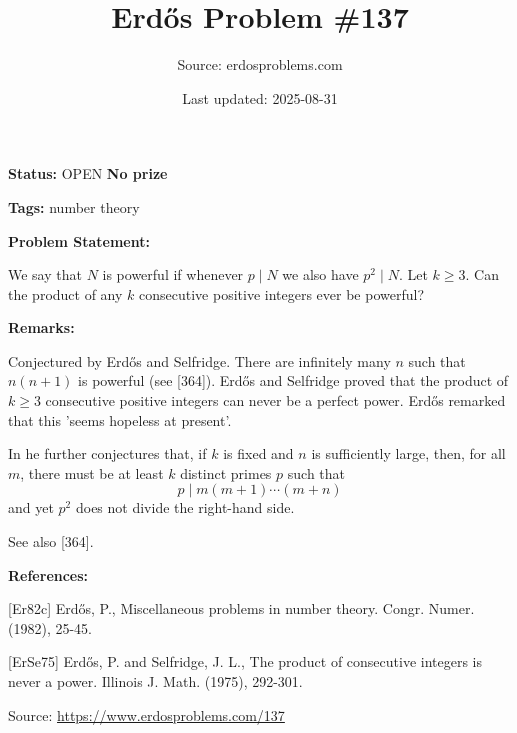 \documentclass{article}
\title{Erd\H{o}s Problem \#137}
\date{Last updated: 2025-08-31}
\author{Source: erdosproblems.com}
\begin{document}
\maketitle

\noindent\textbf{Status:} OPEN \quad \textbf{No prize}

\noindent\textbf{Tags:} number theory

\medskip
\noindent\textbf{Problem Statement:}

We say that $N$ is powerful if whenever $p\mid N$ we also have $p^2\mid N$. Let $k\geq 3$. Can the product of any $k$ consecutive positive integers ever be powerful?

\bigskip
\noindent\textbf{Remarks:}

Conjectured by Erd\H{o}s and Selfridge. There are infinitely many $n$ such that $n(n+1)$ is powerful (see [364]). Erd\H{o}s and Selfridge \cite{ErSe75} proved that the product of $k\geq 3$ consecutive positive integers can never be a perfect power. Erd\H{o}s remarked that this 'seems hopeless at present'.

In \cite{Er82c} he further conjectures that, if $k$ is fixed and $n$ is sufficiently large, then, for all $m$, there must be at least $k$ distinct primes $p$ such that\[p\mid m(m+1)\cdots (m+n)\]and yet $p^2$ does not divide the right-hand side.

See also [364].

\bigskip
\noindent\textbf{References:}

[Er82c] Erd\H{o}s, P., Miscellaneous problems in number theory. Congr. Numer. (1982), 25-45.
 
 [ErSe75] Erd\H{o}s, P. and Selfridge, J. L., The product of consecutive integers is never a power. Illinois J. Math. (1975), 292-301.

\bigskip
\noindent\small{Source: \url{https://www.erdosproblems.com/137}}
\end{document}
